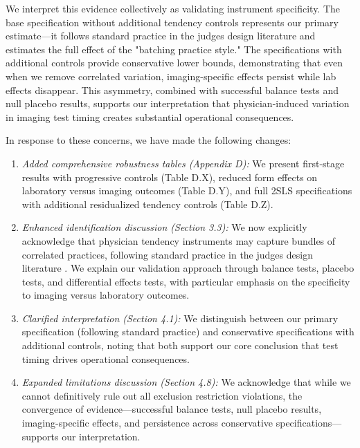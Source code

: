 \documentclass[11pt]{article}
\newcommand{\1}{\hbox{\rm 1\kern-.35em 1}}
\begin{document}
{We interpret this evidence collectively as validating instrument specificity. The base specification without additional tendency controls represents our primary estimate—it follows standard practice in the judges design literature and estimates the full effect of the "batching practice style." The specifications with additional controls provide conservative lower bounds, demonstrating that even when we remove correlated variation, imaging-specific effects persist while lab effects disappear. This asymmetry, combined with successful balance tests and null placebo results, supports our interpretation that physician-induced variation in imaging test timing creates substantial operational consequences.

In response to these concerns, we have made the following changes:

\begin{enumerate}
\item \textit{Added comprehensive robustness tables (Appendix D):} We present first-stage results with progressive controls (Table D.X), reduced form effects on laboratory versus imaging outcomes (Table D.Y), and full 2SLS specifications with additional residualized tendency controls (Table D.Z).

\item \textit{Enhanced identification discussion (Section 3.3):} We now explicitly acknowledge that physician tendency instruments may capture bundles of correlated practices, following standard practice in the judges design literature \cite{dobbie2018effects}. We explain our validation approach through balance tests, placebo tests, and differential effects tests, with particular emphasis on the specificity to imaging versus laboratory outcomes.

\item \textit{Clarified interpretation (Section 4.1):} We distinguish between our primary specification (following standard practice) and conservative specifications with additional controls, noting that both support our core conclusion that test timing drives operational consequences.

\item \textit{Expanded limitations discussion (Section 4.8):} We acknowledge that while we cannot definitively rule out all exclusion restriction violations, the convergence of evidence—successful balance tests, null placebo results, imaging-specific effects, and persistence across conservative specifications—supports our interpretation.
\end{enumerate}

}
\end{document}
